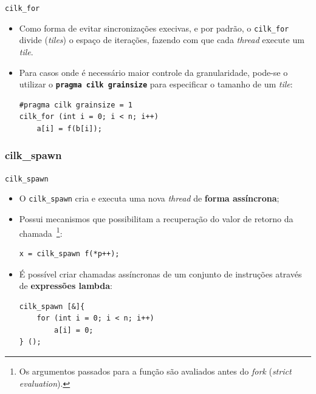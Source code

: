 \documentclass{beamer}
\begin{document}
\begin{frame}[fragile]{\texttt{cilk\_for}}
\begin{itemize}
    \item Como forma de evitar sincronizações execivas, e por padrão, o 
    \texttt{cilk\_for} divide (\textit{tiles}) o espaço de iterações, fazendo 
    com que cada \textit{thread} execute um \textit{tile}.
    \item Para casos onde é necessário maior controle da granularidade,
    pode-se o utilizar o \textbf{\texttt{pragma cilk grainsize}} para
    especificar o tamanho de um \textit{tile}:
\begin{lstlisting}
#pragma cilk grainsize = 1
cilk_for (int i = 0; i < n; i++)
    a[i] = f(b[i]);
\end{lstlisting}
\end{itemize}

\end{frame}
{
\subsubsection{cilk\_spawn}
\begin{frame}[fragile]{\texttt{cilk\_spawn}}
\begin{itemize}
    \item O \texttt{cilk\_spawn} cria e executa uma nova \textit{thread}
    de \textbf{forma assíncrona};
    \item Possui mecanismos que possibilitam a recuperação do valor de retorno
    da chamada~\footnote{Os argumentos passados para a função são
    avaliados antes do \textit{fork} (\textit{strict evaluation}).}:
\begin{lstlisting}
x = cilk_spawn f(*p++);
\end{lstlisting}
    \item É possível criar chamadas assíncronas de um conjunto de instruções
    através de \textbf{expressões lambda}:
\begin{lstlisting}
cilk_spawn [&]{
    for (int i = 0; i < n; i++)
        a[i] = 0;
} ();
\end{lstlisting}
\end{itemize}
\end{frame}
}
\end{document}

